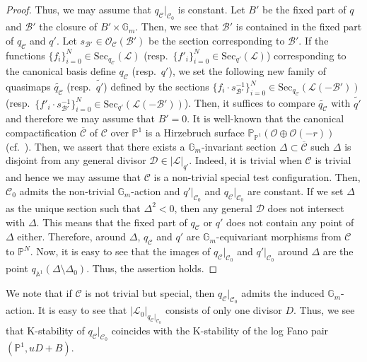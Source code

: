 \documentclass[12pt,twoside]{amsart}
\theoremstyle{definition}
\begin{document}
\begin{proof}
Thus, we may assume that $q_{\mathcal{C}}|_{\mathcal{C}_0}$ is constant.
Let $B'$ be the fixed part of $q$ and $\mathcal{B}'$ the closure of $B'\times\mathbb{G}_m$.
Then, we see that $\mathcal{B}'$ is contained in the fixed part of $q_{\mathcal{C}}$ and $q'$.
Let $s_{\mathcal{B}'}\in\mathcal{O}_{\mathcal{C}}(\mathcal{B}')$ be the section corresponding to $\mathcal{B}'$.
If the functions $\{f_i\}_{i=0}^N\in\mathrm{Sec}_{q_{\mathcal{C}}}(\mathscr{L})$ (resp.~$\{f'_i\}_{i=0}^N\in\mathrm{Sec}_{q'}(\mathscr{L})$) corresponding to the canonical basis define $q_{\mathcal{C}}$ (resp.~$q'$), we set the following new family of quasimaps $\widetilde{q_{\mathcal{C}}}$ (resp.~$\widetilde{q'}$) defined by the sections $\{f_i\cdot s_{\mathcal{B}'}^{-1}\}_{i=0}^N\in\mathrm{Sec}_{q_{\mathcal{C}}}(\mathscr{L}(-\mathcal{B}'))$ (resp.~$\{f'_i\cdot s_{\mathcal{B}'}^{-1}\}_{i=0}^N\in\mathrm{Sec}_{q'}(\mathscr{L}(-\mathcal{B}'))$).
Then, it suffices to compare $\widetilde{q_{\mathcal{C}}}$ with $\widetilde{q'}$ and therefore we may assume that $B'=0$.
It is well-known that the canonical compactification $\overline{\mathcal{C}}$ of $\mathcal{C}$ over $\mathbb{P}^1$ is a Hirzebruch surface $\mathbb{P}_{\mathbb{P}^1}(\mathcal{O}\oplus\mathcal{O}(-r))$ (cf.~\cite[Example 2.8]{BHJ}).
Then, we assert that there exists a $\mathbb{G}_m$-invariant section $\Delta\subset \overline{\mathcal{C}}$ such $\Delta$ is disjoint from any general divisor $\mathcal{D}\in|\mathscr{L}|_{q'}$.
Indeed, it is trivial when $\mathcal{C}$ is trivial and hence we may assume that $\mathcal{C}$ is a non-trivial special test configuration.
Then, $\mathcal{C}_0$ admits the non-trivial $\mathbb{G}_m$-action and $q'|_{\mathcal{C}_0}$ and $q_{\mathcal{C}}|_{\mathcal{C}_0}$ are constant. 
If we set $\Delta$ as the unique section such that $\Delta^2<0$, then any general $\mathcal{D}$ does not intersect with $\Delta$. 
This means that the fixed part of $q_{\mathcal{C}}$ or $q'$ does not contain any point of $\Delta$ either.
Therefore, around $\Delta$, $q_{\mathcal{C}}$ and $q'$ are $\mathbb{G}_m$-equivariant morphisms from $\mathcal{C}$ to $\mathbb{P}^N$.
Now, it is easy to see that the images of $q_{\mathcal{C}}|_{\mathcal{C}_0}$ and $q'|_{\mathcal{C}_0}$ around $\Delta$ are the point $q_{\mathbb{A}^1}(\Delta\setminus\Delta_0)$.
Thus, the assertion holds.
\end{proof}


We note that if $\mathcal{C}$ is not trivial but special, then $q_{\mathcal{C}}|_{\mathcal{C}_0}$ admits the induced $\mathbb{G}_m$-action.
It is easy to see that $|\mathscr{L}_0|_{q_{\mathcal{C}}|_{\mathcal{C}_0}}$ consists of only one divisor $D$.
Thus, we see that K-stability of $q_{\mathcal{C}}|_{\mathcal{C}_0}$ coincides with the K-stability of the log Fano pair $(\mathbb{P}^1,uD+B)$.
\end{document}
